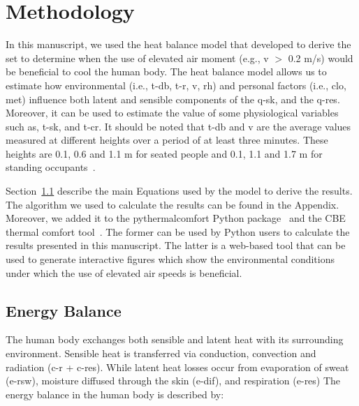 
\section{Methodology}\label{sec:methodology}


In this manuscript, we used the heat balance model that  developed to derive the \ac{set} to determine when the use of elevated air moment (e.g., \ac{v} $>$ 0.2 m/s) would be beneficial to cool the human body.
The heat balance model allows us to estimate how environmental (i.e., \ac{t-db}, \ac{t-r}, \ac{v}, \ac{rh}) and personal factors (i.e., \ac{clo}, \ac{met}) influence both latent and sensible components of the \ac{q-sk}, and the \ac{q-res}.
Moreover, it can be used to estimate the value of some physiological variables such as, \ac{t-sk}, and \ac{t-cr}.
It should be noted that \ac{t-db} and \ac{v} are the average values measured at different heights over a period of at least three minutes.
These heights are 0.1, 0.6 and 1.1 m for seated people and 0.1, 1.1 and 1.7 m for standing occupants~\cite{ashrae552017}.

Section~\ref{subsec:energy-balance} describe the main Equations used by the model to derive the results.
The algorithm we used to calculate the results can be found in the Appendix.
Moreover, we added it to the pythermalcomfort Python package~\cite{Tartarini2020a} and the CBE thermal comfort tool~\cite{Tartarini2020}.
The former can be used by Python users to calculate the results presented in this manuscript.
The latter is a web-based tool that can be used to generate interactive figures which show the environmental conditions under which the use of elevated air speeds is beneficial.

\subsection{Energy Balance}\label{subsec:energy-balance}

The human body exchanges both sensible and latent heat with its surrounding environment.
Sensible heat is transferred via conduction, convection and radiation (\acs{c-r} + \acs{c-res}).
While latent heat losses occur from evaporation of sweat  (\acs{e-rsw}), moisture diffused through the skin  (\acs{e-dif}), and respiration (\acs{e-res})
The energy balance in the human body is described by:

